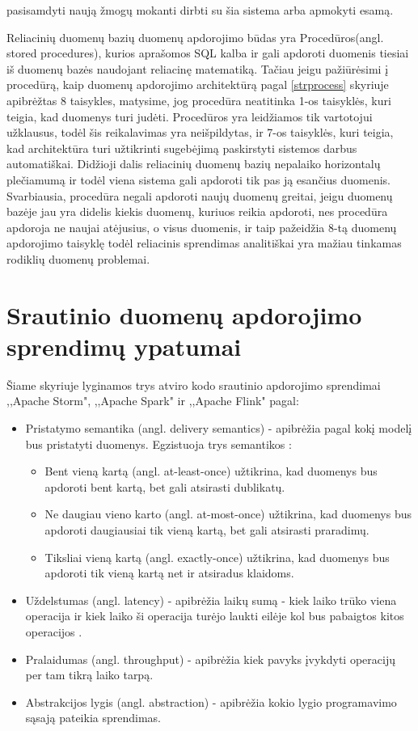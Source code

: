 \documentclass{VUMIFPSkursinis}
\begin{document}
    pasisamdyti naują žmogų mokanti dirbti su šia sistema arba apmokyti esamą. \par
        Reliacinių duomenų bazių duomenų apdorojimo būdas yra Procedūros(angl. stored procedures), kurios aprašomos SQL kalba ir gali apdoroti duomenis tiesiai iš duomenų bazės 
    naudojant reliacinę matematiką. Tačiau jeigu pažiūrėsimi į procedūrą, kaip duomenų apdorojimo architektūrą pagal \ref{strprocess} skyriuje apibrėžtas 8 taisykles, 
    matysime, jog procedūra neatitinka 1-os taisyklės, kuri teigia, kad duomenys turi judėti. Procedūros yra leidžiamos tik vartotojui užklausus, todėl šis reikalavimas yra neišpildytas, 
    ir 7-os taisyklės, kuri teigia, kad architektūra turi užtikrinti sugebėjimą paskirstyti sistemos darbus automatiškai. Didžioji dalis reliacinių duomenų bazių nepalaiko horizontalų 
    plečiamumą \cite{cattelsql, jkubas} ir todėl viena sistema gali apdoroti tik pas ją esančius duomenis. Svarbiausia, procedūra negali apdoroti naujų duomenų greitai, jeigu duomenų bazėje 
    jau yra didelis kiekis duomenų, kuriuos reikia apdoroti, nes procedūra apdoroja ne naujai atėjusius, o visus duomenis, ir taip pažeidžia 8-tą duomenų apdorojimo taisyklę todėl reliacinis sprendimas
    analitiškai yra mažiau tinkamas rodiklių duomenų problemai.


\section{Srautinio duomenų apdorojimo sprendimų ypatumai} \label{srautarch}
Šiame skyriuje lyginamos trys atviro kodo srautinio apdorojimo sprendimai ,,Apache Storm", ,,Apache Spark" ir ,,Apache Flink" pagal:
\begin{itemize}
    \item Pristatymo semantika (angl. delivery semantics) - apibrėžia pagal kokį modelį bus pristatyti duomenys. Egzistuoja trys semantikos \cite{ensar20}: 
    \begin{itemize}
        \item Bent vieną kartą (angl. at-least-once) užtikrina, kad duomenys bus apdoroti bent kartą, bet gali atsirasti dublikatų. 
        \item Ne daugiau vieno karto (angl. at-most-once) užtikrina, kad duomenys bus apdoroti daugiausiai tik vieną kartą, bet gali atsirasti praradimų. 
        \item Tiksliai vieną kartą (angl. exactly-once) užtikrina, kad duomenys bus apdoroti tik vieną kartą net ir atsiradus klaidoms.
    \end{itemize}
    \item Uždelstumas (angl. latency) - apibrėžia laikų sumą - kiek laiko trūko viena operacija ir kiek laiko ši operacija turėjo laukti eilėje
    kol bus pabaigtos kitos operacijos \cite{karimov2018benchmarking}.
    \item Pralaidumas (angl. throughput) - apibrėžia kiek pavyks įvykdyti operacijų per tam tikrą laiko tarpą.
    \item Abstrakcijos lygis (angl. abstraction) - apibrėžia kokio lygio programavimo sąsają pateikia sprendimas.
\end{itemize}
\end{document}
